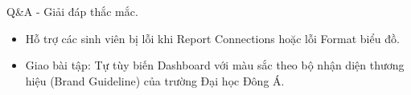 \documentclass[aspectratio=169]{beamer}
\begin{document}
\begin{frame}{Q\&A - Giải đáp thắc mắc.}
    \begin{itemize}
        \item Hỗ trợ các sinh viên bị lỗi khi Report Connections hoặc lỗi Format biểu đồ.
        \item Giao bài tập: Tự tùy biến Dashboard với màu sắc theo bộ nhận diện thương hiệu (Brand Guideline) của trường Đại học Đông Á.
    \end{itemize}
\end{frame}
\end{document}
